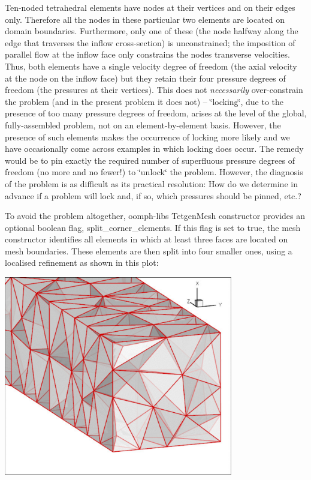 Ten-\/noded tetrahedral elements have nodes at their vertices and on their edges only. Therefore all the nodes in these particular two elements are located on domain boundaries. Furthermore, only one of these (the node halfway along the edge that traverses the inflow cross-\/section) is unconstrained; the imposition of parallel flow at the inflow face only constrains the node\textquotesingle{}s transverse velocities. Thus, both elements have a single velocity degree of freedom (the axial velocity at the node on the inflow face) but they retain their four pressure degrees of freedom (the pressures at their vertices). This does not {\itshape necessarily} over-\/constrain the problem (and in the present problem it does not) -- \char`\"{}locking\char`\"{}, due to the presence of too many pressure degrees of freedom, arises at the level of the global, fully-\/assembled problem, not on an element-\/by-\/element basis. However, the presence of such elements makes the occurrence of locking more likely and we have occasionally come across examples in which locking does occur. The remedy would be to pin exactly the required number of superfluous pressure degrees of freedom (no more and no fewer!) to \char`\"{}unlock\char`\"{} the problem. However, the diagnosis of the problem is as difficult as its practical resolution\+: How do we determine in advance if a problem will lock and, if so, which pressures should be pinned, etc.?

To avoid the problem altogether, {\ttfamily oomph-\/lib\textquotesingle{}s} {\ttfamily Tetgen\+Mesh} constructor provides an optional boolean flag, {\ttfamily split\+\_\+corner\+\_\+elements}. If this flag is set to {\ttfamily true}, the mesh constructor identifies all elements in which at least three faces are located on mesh boundaries. These elements are then split into four smaller ones, using a localised refinement as shown in this plot\+:

 
\begin{DoxyImage}
\includegraphics[width=0.75\textwidth]{mesh_with_split}
\end{DoxyImage}


